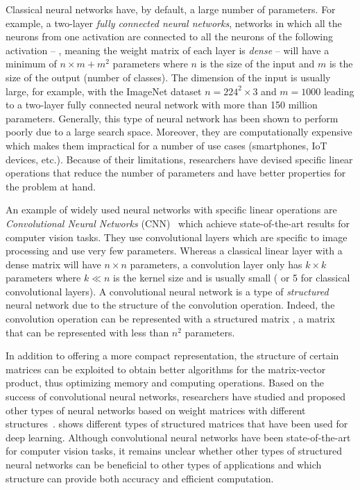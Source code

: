 Classical neural networks have, by default, a large number of parameters.
For example, a two-layer \emph{fully connected neural networks}, networks in which all the neurons from one activation are connected to all the neurons of the following activation -- \ie, meaning the weight matrix of each layer is \emph{dense} -- will have a minimum of $n \times m + m^2$ parameters where $n$ is the size of the input and $m$ is the size of the output (number of classes).
The dimension of the input is usually large, for example, with the ImageNet dataset $n = 224^2 \times 3$ and $m = 1000$ leading to a two-layer fully connected neural network with more than 150 million parameters.
Generally, this type of neural network has been shown to perform poorly due to a large search space.
Moreover, they are computationally expensive which makes them impractical for a number of use cases (smartphones, IoT devices, etc.).
Because of their limitations, researchers have devised specific linear operations that reduce the number of parameters and have better properties for the problem at hand.

An example of widely used neural networks with specific linear operations are \emph{Convolutional Neural Networks} (CNN)~\cite{lecun1998gradient,krizhevsky2012imagenet,he2016deep,tan2019efficientnet} which achieve state-of-the-art results for computer vision tasks.
They use convolutional layers which are specific to image processing and use very few parameters.
Whereas a classical linear layer with a dense matrix will have $n \times n$ parameters, a convolution layer only has $k \times k$ parameters where $k \ll n$ is the kernel size and is usually small ( or 5 for classical convolutional layers).
A convolutional neural network is a type of \emph{structured} neural network due to the structure of the convolution operation.
Indeed, the convolution operation can be represented with a structured matrix \ie, a matrix that can be represented with less than $n^2$ parameters.

In addition to offering a more compact representation, the structure of certain matrices can be exploited to obtain better algorithms for the matrix-vector product, thus optimizing memory and computing operations.
Based on the success of convolutional neural networks, researchers have studied and proposed other types of neural networks based on weight matrices with different structures~\cite{moczulski2016acdc,sindhwani2015structured,denil2013predicting}.
 shows different types of structured matrices that have been used for deep learning.
Although convolutional neural networks have been state-of-the-art for computer vision tasks, it remains unclear whether other types of structured neural networks can be beneficial to other types of applications and which structure can provide both accuracy and efficient computation.



